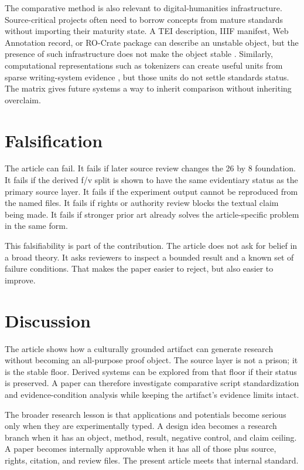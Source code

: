 \documentclass[sigconf,nonacm]{acmart}
\begin{document}
The comparative method is also relevant to digital-humanities infrastructure.
Source-critical projects often need to borrow concepts from mature standards
without importing their maturity state. A TEI description, IIIF manifest, Web
Annotation record, or RO-Crate package can describe an unstable object, but the
presence of such infrastructure does not make the object stable
\cite{teiP5Glyphs,iiifPresentation3,w3cAnnotationModel,w3cAnnotationVocab,rocrate12}.
Similarly, computational representations such as tokenizers can create useful
units from sparse writing-system evidence \cite{sennrich2016bpe,kudo2018sentencepiece,bostrom2020bytepair,rust2021tokenization}, but those units do not
settle standards status. The matrix gives future systems a way to inherit
comparison without inheriting overclaim.

\section{Falsification}
The article can fail. It fails if later source review changes the 26 by 8
foundation. It fails if the derived f/v split is shown to have the same
evidentiary status as the primary source layer. It fails if the experiment output
cannot be reproduced from the named files. It fails if rights or authority review
blocks the textual claim being made. It fails if stronger prior art already
solves the article-specific problem in the same form.

This falsifiability is part of the contribution. The article does not ask for
belief in a broad theory. It asks reviewers to inspect a bounded result and a
known set of failure conditions. That makes the paper easier to reject, but also
easier to improve.

\section{Discussion}
The article shows how a culturally grounded artifact can generate research
without becoming an all-purpose proof object. The source layer is not a prison;
it is the stable floor. Derived systems can be explored from that floor if their
status is preserved. A paper can therefore investigate comparative script standardization and evidence-condition analysis while keeping the
artifact's evidence limits intact.

The broader research lesson is that applications and potentials become serious
only when they are experimentally typed. A design idea becomes a research branch
when it has an object, method, result, negative control, and claim ceiling. A
paper becomes internally approvable when it has all of those plus source, rights,
citation, and review files. The present article meets that internal standard.
\end{document}
